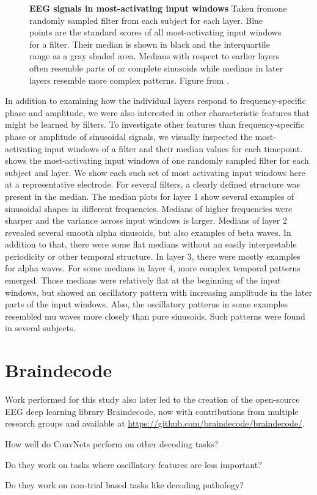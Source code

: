 \begin{figure}[htb]
    \caption[EEG signals in most-activating windows. per-electrode class prototypes]{
\textbf{EEG signals in most-activating input windows} Taken fromone randomly
sampled filter from each subject for each layer. Blue points are the
standard scores of all most-activating input windows for a filter. Their
median is shown in black and the interquartile range as a gray shaded
area. Medians with respect to earlier layers often resemble parts of or
complete sinusoids while medians in later layers resemble more complex
patterns. Figure from \citet{hartmann2018hierarchical}. 
    }\label{maximally-activating-units-fig}
\end{figure}



    In addition to examining how the individual layers respond to
frequency-specific phase and amplitude, we were also interested in other
characteristic features that might be learned by filters. To investigate
other features than frequency-specific phase or amplitude of sinusoidal
signals, we visually inspected the most-activating input windows of a
filter and their median values for each timepoint.
 shows the
most-activating input windows of one randomly sampled filter for each
subject and layer. We show each such set of most activating input
windows here at a representative electrode.
% 
For several filters, a clearly defined structure was present in the
median. The median plots for layer 1 show several examples of sinusoidal
shapes in different frequencies. Medians of higher frequencies were
sharper and the variance across input windows is larger. Medians of
layer 2 revealed several smooth alpha sinusoids, but also examples of
beta waves. In addition to that, there were some flat medians without an
easily interpretable periodicity or other temporal structure. In layer
3, there were mostly examples for alpha waves. For some medians in layer
4, more complex temporal patterns emerged. Those medians were relatively
flat at the beginning of the input windows, but showed an oscillatory
pattern with increasing amplitude in the later parts of the input
windows. Also, the oscillatory patterns in some examples resembled mu
waves more closely than pure sinusoids. Such patterns were found in
several subjects.

\section{Braindecode}\label{braindecode}

Work performed for this study also later led to the creation of the
open-source EEG deep learning library Braindecode, now with
contributions from multiple research groups and available at
\url{https://github.com/braindecode/braindecode/}.

\begin{openbox}
\item How well do ConvNets perform on other decoding tasks?
\item Do they work on tasks where oscillatory features are less important?
\item Do they work on non-trial based tasks like decoding pathology?
\end{openbox}
